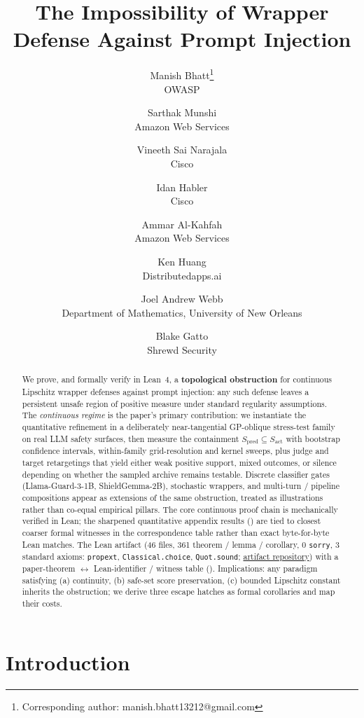 \documentclass[11pt]{article}
\title{The Impossibility of Wrapper Defense Against Prompt Injection}
\author{
    {\rm Manish Bhatt\thanks{Corresponding author: manish.bhatt13212@gmail.com}}\hspace{0.5em}\footnotemark[2]\\
    OWASP
    \and
    {\rm Sarthak Munshi}\footnotemark[2]\\
    Amazon Web Services
  \and
  {\rm Vineeth Sai Narajala}\footnotemark[2]\\
  Cisco
  \and
  {\rm Idan Habler}\footnotemark[2]\\
  Cisco
  \and
  {\rm Ammar Al-Kahfah}\footnotemark[2]\\
  Amazon Web Services
  \and
  {\rm Ken Huang}\\
  Distributedapps.ai
  \and
  {\rm Joel Andrew Webb}\\
  Department of Mathematics, University of New Orleans
  \and
  {\rm Blake Gatto}\\
  Shrewd Security
  }
\date{}
\begin{document}
\maketitle
\renewcommand{\thefootnote}{\fnsymbol{footnote}}
\begin{abstract}
We prove, and formally verify in Lean~4, a \textbf{topological
obstruction} for continuous Lipschitz wrapper defenses against prompt
injection: any such defense leaves a persistent unsafe region of
positive measure under standard regularity assumptions. The
\emph{continuous regime} is the paper's primary contribution: we
instantiate the quantitative refinement in a deliberately
near-tangential GP-oblique stress-test family on real LLM safety
surfaces, then measure the containment
$S_{\text{pred}} \subseteq S_{\text{act}}$ with bootstrap confidence
intervals, within-family grid-resolution and kernel sweeps, plus judge
and target retargetings that yield either weak positive support,
mixed outcomes, or silence depending on whether the sampled archive
remains testable.
Discrete
classifier gates (Llama-Guard-3-1B, ShieldGemma-2B), stochastic
wrappers, and multi-turn / pipeline compositions appear as extensions
of the same obstruction, treated as illustrations rather than co-equal
empirical pillars. The core continuous proof chain is mechanically
verified in Lean; the sharpened quantitative appendix results
() are tied to closest coarser formal
witnesses in the correspondence table rather than exact byte-for-byte
Lean matches. The
Lean artifact (46 files, 361 theorem / lemma / corollary,
0 \texttt{sorry}, 3 standard axioms: \texttt{propext},
\texttt{Classical.choice}, \texttt{Quot.sound};
\href{https://github.com/mbhatt1/stuff/tree/main/ManifoldProofs}{artifact repository}) with a
paper-theorem $\leftrightarrow$ Lean-identifier / witness table
(). Implications: any paradigm
satisfying (a) continuity, (b) safe-set score preservation, (c)
bounded Lipschitz constant inherits the obstruction; we derive three
escape hatches as formal corollaries and map their costs.
\end{abstract}


\section{Introduction}
\label{sec:intro}
\end{document}
